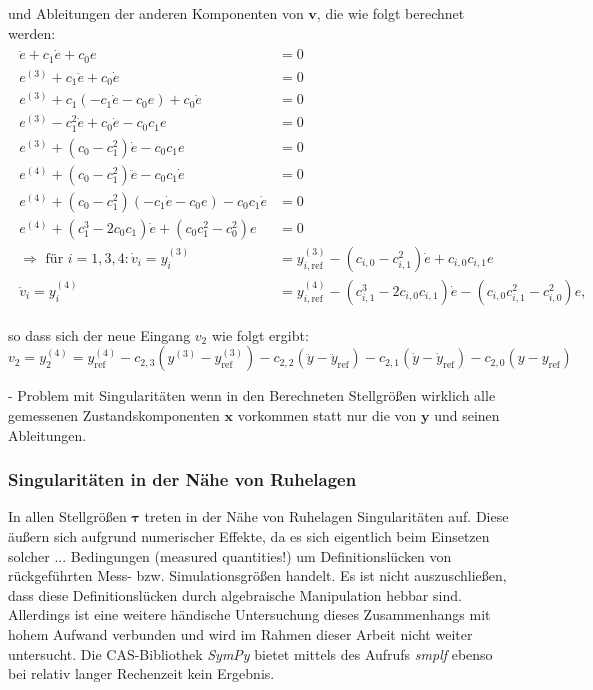 und Ableitungen der anderen Komponenten von $\pmb{v}$, die wie folgt berechnet werden:
\begin{align}
	\begin{split}
	    \ddot{e} + c_1 \dot{e} + c_0 e &= 0 \\
		e^{(3)} + c_1 \ddot{e} + c_0 \dot{e} &= 0 \\
		e^{(3)} + c_1 (-c_1 \dot{e} - c_0 e) + c_0 \dot{e} &= 0 \\
		e^{(3)} - c_1^2 \dot{e} + c_0 \dot{e} - c_0 c_1 e &= 0 \\
		e^{(3)} + (c_0 - c_1^2) \dot{e} - c_0 c_1 e &= 0 \\
		e^{(4)} + (c_0 - c_1^2) \ddot{e} - c_0 c_1 \dot{e} &= 0 \\
		e^{(4)} + (c_0 - c_1^2) (-c_1 \dot{e} - c_0 e) - c_0 c_1 \dot{e} &= 0 \\
		e^{(4)} + (c_1^3 - 2 c_0 c_1) \dot{e} + (c_0 c_1^2 - c_0^2) e &= 0 \\
		\Rightarrow \text{ für } i = 1,3,4: \dot{v}_i = y_i^{(3)} &= y_{i, \text{ref}}^{(3)} - (c_{i, 0} - c_{i, 1}^2) \dot{e} + c_{i, 0} c_{i, 1} e \\
		\ddot{v}_i = y_i^{(4)} &= y_{i, \text{ref}}^{(4)} - (c_{i, 1}^3 - 2 c_{i, 0} c_{i, 1}) \dot{e} - (c_{i, 0} c_{i, 1}^2 - c_{i, 0}^2) e,
	\end{split}
\end{align}

so dass sich der neue Eingang $v_2$ wie folgt ergibt:
\begin{equation}
	v_2 = y_2^{(4)} = y_{\text{ref}}^{(4)} - c_{2, 3} (y^{(3)} - y_{\text{ref}}^{(3)}) - c_{2, 2} (\ddot{y} - \ddot{y}_{\text{ref}}) - c_{2, 1} (\dot{y} - \dot{y}_{\text{ref}}) - c_{2, 0} (y - y_{\text{ref}})
\end{equation} 

- Problem mit Singularitäten wenn in den Berechneten Stellgrößen wirklich alle gemessenen Zustandskomponenten $\pmb{x}$ vorkommen statt nur die von $\pmb{y}$ und seinen Ableitungen.

\subsubsection{Singularitäten in der Nähe von Ruhelagen}
In allen Stellgrößen $\pmb{\tau}$ treten in der Nähe von Ruhelagen Singularitäten auf. Diese äußern sich aufgrund numerischer Effekte, da es sich eigentlich beim Einsetzen solcher ... Bedingungen (measured quantities!) um Definitionslücken von rückgeführten Mess- bzw. Simulationsgrößen handelt. Es ist nicht auszuschließen, dass diese Definitionslücken durch algebraische Manipulation hebbar sind. Allerdings ist eine weitere händische Untersuchung dieses Zusammenhangs mit hohem Aufwand verbunden und wird im Rahmen dieser Arbeit nicht weiter untersucht. Die CAS-Bibliothek \textit{SymPy} bietet mittels des Aufrufs \textit{smplf} ebenso bei relativ langer Rechenzeit kein Ergebnis.

